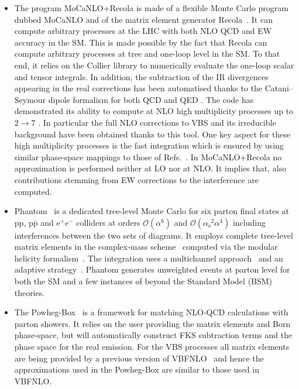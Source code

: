 \documentclass[twocolumn,epjc3]{svjour3} %
\newcommand{\Pp}{\ensuremath{\text{p}}\xspace}
\newcommand{\Pe}{\ensuremath{\text{e}}\xspace}
\newcommand{\alphas}{\ensuremath{\alpha_\text{s}}\xspace}
\begin{document}
\begin{itemize}
    \item The program {\sc MoCaNLO+Recola} is made of a flexible Monte Carlo program dubbed {\sc MoCaNLO} and of the matrix element generator {\sc Recola}~\cite{Actis:2012qn,Actis:2016mpe}.
    It can compute arbitrary processes at the LHC with both NLO QCD and EW accuracy in the SM.
    This is made possible by the fact that {\sc Recola} can compute arbitrary processes at tree and one-loop level in the SM.
    To that end, it relies on the {\sc Collier} library \cite{Denner:2014gla,Denner:2016kdg} to numerically evaluate the one-loop scalar and tensor integrals.
    In addition, the subtraction of the IR divergences appearing in the real corrections has been automatised thanks to the Catani--Seymour dipole formalism for both QCD and QED \cite{Catani:1996vz,Dittmaier:1999mb}.
    The code has demonstrated its ability to compute at NLO high multiplicity processes up to $2 \to 7$ \cite{Denner:2015yca,Denner:2016wet}.
    In particular the full NLO corrections to VBS and its irreducible background \cite{Biedermann:2016yds,Biedermann:2017bss} have been obtained thanks to this tool.
    One key aspect for these high multiplicity processes is the fast integration which is ensured by using similar phase-space mappings to those of Refs.~\cite{Berends:1994pv,Denner:1999gp,Dittmaier:2002ap}. 
    In {\sc MoCaNLO+Recola} no approximation is performed neither at LO nor at NLO.
    It implies that, also contributions stemming from EW corrections to the interference are computed.
            
      \item {\sc Phantom}~\cite{Ballestrero:2007xq} is a dedicated tree-level Monte Carlo for six parton final states 
      at $\Pp \Pp,\, \Pp\bar{\Pp}$ and $\Pe^+\Pe^-$ colliders at orders $\mathcal O(\alpha^6)$ and $\mathcal O(\alphas^2\alpha^4)$ including interferences between the two sets of diagrams.
    It employs complete tree-level matrix elements in the complex-mass scheme~\cite{Denner:1999gp,Denner:2005fg,Denner:2006ic} computed via the modular helicity formalism~\cite{Ballestrero:1999md,Ballestrero:1994jn}.
    The integration uses a multichannel approach~\cite{Berends:1984gf} and an adaptive strategy~\cite{Lepage:1977sw}.
    {\sc Phantom} generates unweighted events at parton level for both the SM and a few instances of beyond the Standard Model (BSM) theories.

      \item The {\sc Powheg-Box}~\cite{Nason:2004rx,Frixione:2007vw,Alioli:2010xd} is a framework for matching NLO-QCD calculations with parton showers.
    It relies on the user providing the matrix elements and Born phase-space, but will automatically construct FKS \cite{Frixione:1995ms} subtraction terms and the phase space for the real emission.
    For the VBS processes all matrix elements are being provided by a previous version of {\sc VBFNLO}~\cite{Arnold:2008rz, Arnold:2011wj, Baglio:2014uba} and hence the approximations used in the {\sc Powheg-Box} are similar to those used in {\sc VBFNLO}.


\end{itemize}
\end{document}
